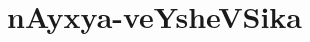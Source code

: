 \makeatletter
\def\@makechapterhead#1{%
  \vspace*{10\p@}%
{\fontsize{13pt}{13pt}\selectfont\raggedright{\bf  satAkxri muKajiR}\par}
\vspace*{25\p@}%
  {\parindent \z@ \centering \normalfont
    \ifnum \c@secnumdepth >\m@ne
      \if@mainmatter
        {\huge\bfseries  #1}\par\nobreak
	\vskip 4pt
      \fi
    \fi
\smallskip 

 \vskip 10\p@  
{\fontsize{12pt}{12pt}\selectfont\raggedleft{anu: \bf pu.ti.na.}\par}
  }
\vskip 40\p@}
\makeatother


\chapter{nAyxya-veYsheVSika}\label{chap001}


